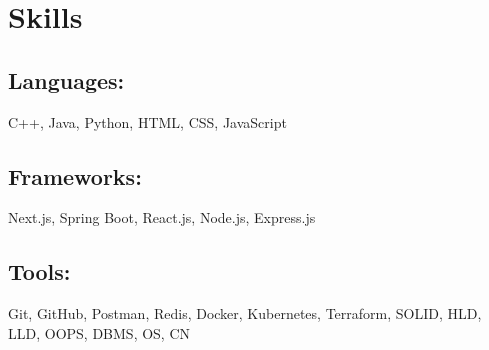 \documentclass[]{deedy-resume-reversed}
\begin{document}
\section{Skills}
\begin{minipage}[t]{0.78\textwidth}
\subsection{Languages:} C++, Java, Python, HTML, CSS, JavaScript \\
\subsection{Frameworks:} Next.js, Spring Boot, React.js, Node.js, Express.js \\
\subsection{Tools:} Git, GitHub, Postman, Redis, Docker, Kubernetes, Terraform, SOLID, HLD, LLD, OOPS, DBMS, OS, CN \\
\end{minipage}
\sectionsep
\end{document}
